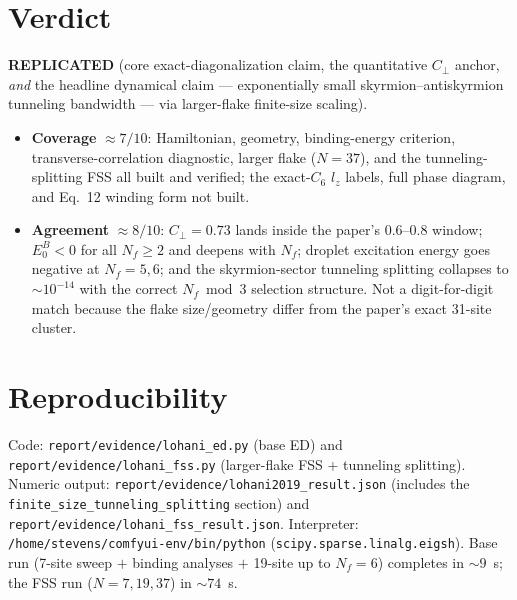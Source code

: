 \documentclass[11pt]{article}
\newcommand{\Cperp}{C_{\perp}}
\begin{document}
\section{Verdict}
\textbf{REPLICATED} (core exact-diagonalization claim, the quantitative $\Cperp$ anchor, \emph{and}
the headline dynamical claim --- exponentially small skyrmion--antiskyrmion tunneling bandwidth ---
via larger-flake finite-size scaling).
\begin{itemize}
\item \textbf{Coverage} $\approx 7/10$: Hamiltonian, geometry, binding-energy criterion,
transverse-correlation diagnostic, larger flake ($N=37$), and the tunneling-splitting FSS all built
and verified; the exact-$C_6$ $l_z$ labels, full phase diagram, and Eq.~12 winding form not built.
\item \textbf{Agreement} $\approx 8/10$: $\Cperp=0.73$ lands inside the paper's $0.6$--$0.8$ window;
$E_0^B<0$ for all $N_f\ge2$ and deepens with $N_f$; droplet excitation energy goes negative at
$N_f=5,6$; and the skyrmion-sector tunneling splitting collapses to $\sim10^{-14}$ with the correct
$N_f\bmod3$ selection structure. Not a digit-for-digit match because the flake size/geometry differ
from the paper's exact 31-site cluster.
\end{itemize}

\section*{Reproducibility}
Code: \texttt{report/evidence/lohani\_ed.py} (base ED) and
\texttt{report/evidence/lohani\_fss.py} (larger-flake FSS + tunneling splitting). Numeric output:
\texttt{report/evidence/lohani2019\_result.json} (includes the
\texttt{finite\_size\_tunneling\_splitting} section) and
\texttt{report/evidence/lohani\_fss\_result.json}. Interpreter:
\texttt{/home/stevens/comfyui-env/bin/python} (\texttt{scipy.sparse.linalg.eigsh}). Base run
(7-site sweep $+$ binding analyses $+$ 19-site up to $N_f=6$) completes in $\sim9$~s; the FSS run
($N=7,19,37$) in $\sim74$~s.
\end{document}
